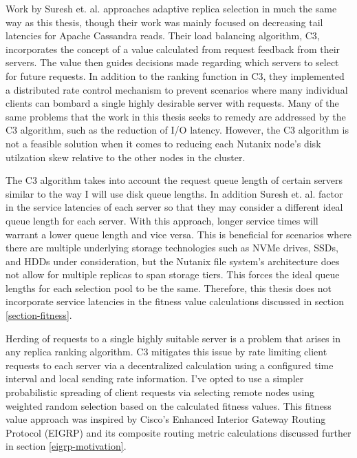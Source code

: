 \documentclass[12pt]{article}
\begin{document}
  Work by Suresh et. al. \cite{suresh2015} approaches adaptive replica
  selection in much the same way as this thesis, though their work was
  mainly focused on decreasing tail latencies for Apache Cassandra
  \cite{cassandra} reads. Their load balancing algorithm, C3, incorporates the
  concept of a value calculated from request feedback from their servers. The
  value then guides decisions made regarding which servers to select for future
  requests.  In addition to the ranking function in C3, they implemented a
  distributed rate control mechanism to prevent scenarios where many individual
  clients can bombard a single highly desirable server with requests. Many of
  the same problems that the work in this thesis seeks to remedy are addressed
  by the C3 algorithm, such as the reduction of I/O latency. However, the C3
  algorithm is not a feasible solution when it comes to reducing each Nutanix
  node's disk utilzation skew relative to the other nodes in the cluster.

  The C3 algorithm takes into account the request queue length of certain
  servers similar to the way I will use disk queue lengths. In addition Suresh
  et. al. factor in the service latencies of each server so that they may
  consider a different ideal queue length for each server. With this approach,
  longer service times will warrant a lower queue length and vice versa. This
  is beneficial for scenarios where there are multiple underlying storage
  technologies such as NVMe drives, SSDs, and HDDs under consideration, but the
  Nutanix file system's architecture does not allow for multiple replicas to
  span storage tiers. This forces the ideal queue lengths for each selection
  pool to be the same. Therefore, this thesis does not incorporate service
  latencies in the fitness value calculations discussed in section
  \ref{section-fitness}.

  Herding of requests to a single highly suitable server is a problem that
  arises in any replica ranking algorithm. C3 mitigates this issue by rate
  limiting client requests to each server via a decentralized calculation using
  a configured time interval and local sending rate information. I've opted to
  use a simpler probabilistic spreading of client requests via selecting remote
  nodes using weighted random selection based on the calculated fitness values.
  This fitness value approach was inspired by Cisco's Enhanced Interior Gateway
  Routing Protocol (EIGRP) \cite{eigrp} and its composite routing metric
  calculations discussed further in section \ref{eigrp-motivation}.
\end{document}
